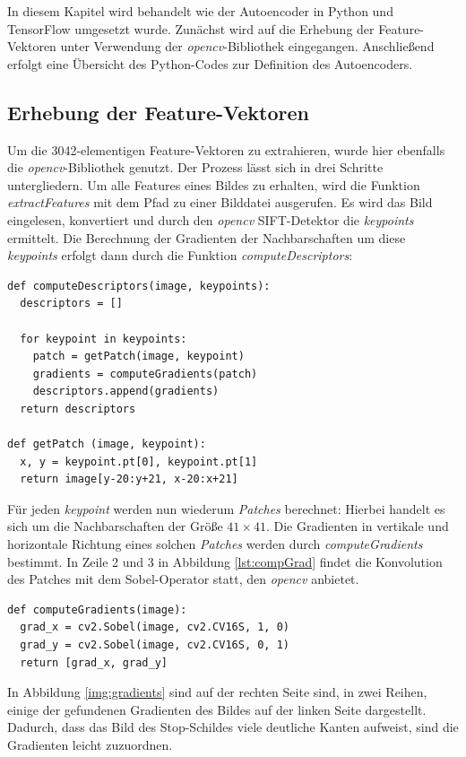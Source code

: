 In diesem Kapitel wird behandelt wie der Autoencoder in Python und TensorFlow umgesetzt wurde. Zunächst wird auf die Erhebung der Feature-Vektoren unter Verwendung der \textit{opencv}-Bibliothek eingegangen. Anschließend erfolgt eine Übersicht des Python-Codes zur Definition des Autoencoders.

\subsection{Erhebung der Feature-Vektoren}

Um die 3042-elementigen Feature-Vektoren zu extrahieren, wurde hier ebenfalls die \textit{opencv}-Bibliothek genutzt. Der Prozess lässt sich in drei Schritte untergliedern. Um alle Features eines Bildes zu erhalten, wird die Funktion \textit{extractFeatures} mit dem Pfad zu einer Bilddatei ausgerufen. Es wird das Bild eingelesen, konvertiert und durch den \textit{opencv} SIFT-Detektor die \textit{keypoints} ermittelt. Die Berechnung der Gradienten der Nachbarschaften um diese \textit{keypoints} erfolgt dann durch die Funktion \textit{computeDescriptors}:

\lstset{language=Python}
\begin{lstlisting}
def computeDescriptors(image, keypoints):
  descriptors = []
  
  for keypoint in keypoints:
  	patch = getPatch(image, keypoint)
  	gradients = computeGradients(patch)
  	descriptors.append(gradients)
  return descriptors
  
def getPatch (image, keypoint):
  x, y = keypoint.pt[0], keypoint.pt[1]
  return image[y-20:y+21, x-20:x+21]
\end{lstlisting}

Für jeden \textit{keypoint} werden nun wiederum \textit{Patches} berechnet: Hierbei handelt es sich um die Nachbarschaften der Größe $41 \times 41$. Die Gradienten in vertikale und horizontale Richtung eines solchen \textit{Patches} werden durch \textit{computeGradients} bestimmt. In Zeile 2 und 3 in Abbildung \ref{lst:compGrad} findet die Konvolution des Patches mit dem Sobel-Operator statt, den \textit{opencv} anbietet.

\begin{lstlisting}
def computeGradients(image):
  grad_x = cv2.Sobel(image, cv2.CV16S, 1, 0)
  grad_y = cv2.Sobel(image, cv2.CV16S, 0, 1)
  return [grad_x, grad_y]
\end{lstlisting}

In Abbildung \ref{img:gradients} sind auf der rechten Seite sind, in zwei Reihen, einige der gefundenen Gradienten des Bildes auf der linken Seite dargestellt. Dadurch, dass das Bild des Stop-Schildes viele deutliche Kanten aufweist, sind die Gradienten leicht zuzuordnen.

